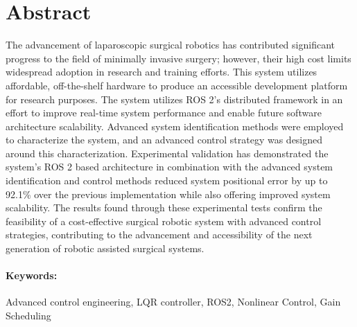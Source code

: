 

\section*{\centering Abstract}

The advancement of laparoscopic surgical robotics has contributed significant progress to the field of minimally invasive surgery; however, their high cost limits widespread adoption in research and training efforts. This system utilizes affordable, off-the-shelf hardware to produce an accessible development platform for research purposes. The system utilizes ROS 2's distributed framework in an effort to improve real-time system performance and enable future software architecture scalability. Advanced system identification methods were employed to characterize the system, and an advanced control strategy was designed around this characterization. Experimental validation has demonstrated the system's ROS 2 based architecture in combination with the advanced system identification and control methods reduced system positional error by up to 92.1\% over the previous implementation while also offering improved system scalability. The results found through these experimental tests confirm the feasibility of a cost-effective surgical robotic system with advanced control strategies, contributing to the advancement and accessibility of the next generation of robotic assisted surgical systems.


\paragraph*{Keywords:} Advanced control engineering, LQR controller, ROS2, Nonlinear Control, Gain Scheduling

\newpage
